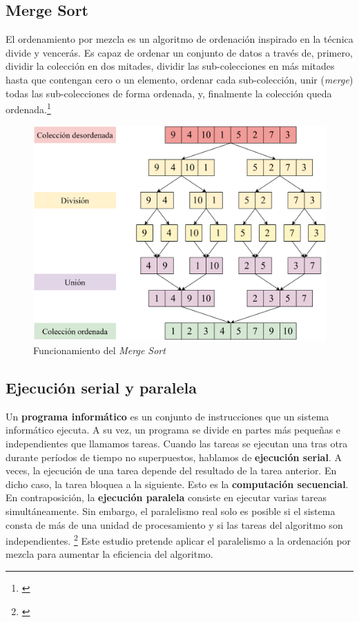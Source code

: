 \documentclass[titlepage]{article}
\begin{document}


\subsection{Merge Sort}
El ordenamiento por mezcla es un algoritmo de ordenación inspirado en la técnica divide y vencerás. Es capaz de ordenar un conjunto de datos a través de, primero, dividir la colección en dos mitades, dividir las sub-colecciones en más mitades hasta que contengan cero o un elemento, ordenar cada sub-colección, unir (\textit{merge}) todas las sub-colecciones de forma ordenada, y, finalmente la colección queda ordenada.\footnote{\cite{skiena-2008}}


\begin{figure}[h]
    \centering
    \includegraphics[width=0.50\linewidth]{Diagrames/arbolMS.png}
    \caption{Funcionamiento del \textit{Merge Sort}}
    \label{fig:arbolMS}
\end{figure}

\subsection{Ejecución serial y paralela}
Un \textbf{programa informático} es un conjunto de instrucciones que un sistema informático ejecuta. A su vez, un programa se divide en partes más pequeñas e independientes que llamamos tareas. Cuando las tareas se ejecutan una tras otra durante períodos de tiempo no superpuestos, hablamos de \textbf{ejecución serial}. A veces, la ejecución de una tarea depende del resultado de la tarea anterior. En dicho caso, la tarea bloquea a la siguiente. Esto es la \textbf{computación secuencial}. En contraposición, la \textbf{ejecución paralela} consiste en ejecutar varias tareas simultáneamente. Sin embargo, el paralelismo real solo es posible si el sistema consta de más de una unidad de procesamiento y si las tareas del algoritmo son independientes. \footnote{\cite{bobrov-2023}} Este estudio pretende aplicar el paralelismo a la ordenación por mezcla para aumentar la eficiencia del algoritmo.
\end{document}
